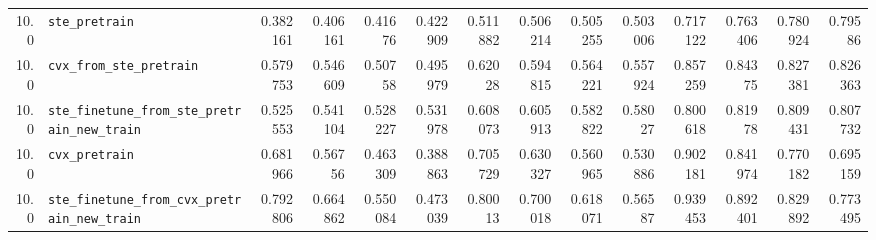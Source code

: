 \begin{longtable}{@{}r l *{12}{r}@{}}
10.0 & \texttt{ste\_pretrain} & 0.382161 & 0.406161 & 0.41676 & 0.422909 & 0.511882 & 0.506214 & 0.505255 & 0.503006 & 0.717122 & 0.763406 & 0.780924 & 0.79586 \\
10.0 & \texttt{cvx\_from\_ste\_pretrain} & 0.579753 & 0.546609 & 0.50758 & 0.495979 & 0.62028 & 0.594815 & 0.564221 & 0.557924 & 0.857259 & 0.84375 & 0.827381 & 0.826363 \\
10.0 & \texttt{ste\_finetune\_from\_ste\_pretrain\_new\_train} & 0.525553 & 0.541104 & 0.528227 & 0.531978 & 0.608073 & 0.605913 & 0.582822 & 0.58027 & 0.800618 & 0.81978 & 0.809431 & 0.807732 \\
10.0 & \texttt{cvx\_pretrain} & 0.681966 & 0.56756 & 0.463309 & 0.388863 & 0.705729 & 0.630327 & 0.560965 & 0.530886 & 0.902181 & 0.841974 & 0.770182 & 0.695159 \\
10.0 & \texttt{ste\_finetune\_from\_cvx\_pretrain\_new\_train} & 0.792806 & 0.664862 & 0.550084 & 0.473039 & 0.80013 & 0.700018 & 0.618071 & 0.56587 & 0.939453 & 0.892401 & 0.829892 & 0.773495 \\
\end{longtable}
